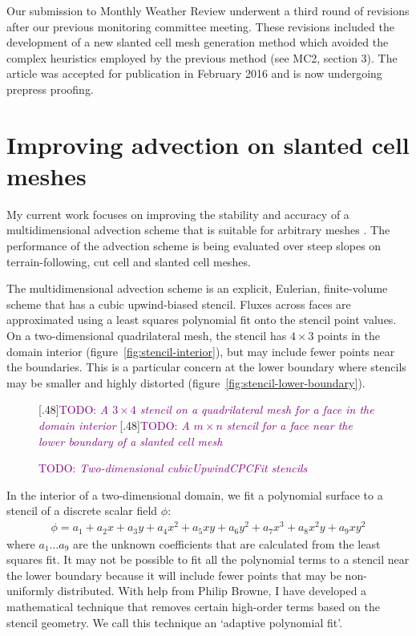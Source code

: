 \documentclass[a4paper,11pt]{article}
\newcommand{\TODO}[1]{\textcolor{purple}{TODO: \emph{#1}}}
\begin{document}
Our submission to Monthly Weather Review underwent a third round of revisions after our previous monitoring committee meeting.  These revisions included the development of a new slanted cell mesh generation method which avoided the complex heuristics employed by the previous method (see MC2, section 3).  The article was accepted for publication in February 2016 and is now undergoing prepress proofing.

\section{Improving advection on slanted cell meshes}
My current work focuses on improving the stability and accuracy of a multidimensional advection scheme that is suitable for arbitrary meshes \citep{weller-shahrokhi2014}.  The performance of the advection scheme is being evaluated over steep slopes on terrain-following, cut cell and slanted cell meshes.

The multidimensional advection scheme is an explicit, Eulerian, finite-volume scheme that has a cubic upwind-biased stencil.  Fluxes across faces are approximated using a least squares polynomial fit onto the stencil point values.
On a two-dimensional quadrilateral mesh, the stencil has $4 \times 3$ points in the domain interior (figure~\ref{fig:stencil-interior}), but may include fewer points near the boundaries.  This is a particular concern at the lower boundary where stencils may be smaller and highly distorted (figure~\ref{fig:stencil-lower-boundary}).

\begin{figure}
	\centering
	[.48\linewidth]{\TODO{A $3 \times 4$ stencil on a quadrilateral mesh for a face in the domain interior}}
	[.48\linewidth]{\TODO{A $m \times n$ stencil for a face near the lower boundary of a slanted cell mesh}}
	\caption{\TODO{Two-dimensional cubicUpwindCPCFit stencils}}
	\label{fig:stencils}
\end{figure}

In the interior of a two-dimensional domain, we fit a polynomial surface to a stencil of a discrete scalar field $\phi$:
\begin{align}
	\phi = a_1 + a_2 x + a_3 y + a_4 x^2 + a_5 x y + a_6 y^2 + a_7 x^3 + a_8 x^2 y + a_9 x y^2
\end{align}
where $a_1 \ldots a_9$ are the unknown coefficients that are calculated from the least squares fit.  It may not be possible to fit all the polynomial terms to a stencil near the lower boundary because it will include fewer points that may be non-uniformly distributed.  With help from Philip Browne, I have developed a mathematical technique that removes certain high-order terms based on the stencil geometry.  We call this technique an `adaptive polynomial fit'.
\end{document}

